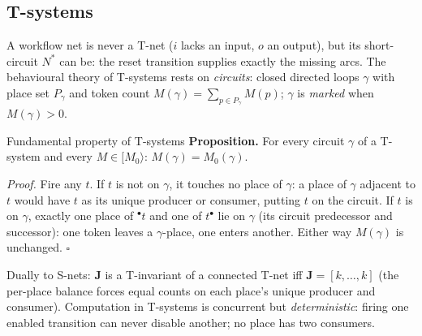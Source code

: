 \subsection{T-systems}

A workflow net is never a T-net ($i$ lacks an input, $o$ an output), but its short-circuit $N^*$ can be: the reset transition supplies exactly the missing arcs. The behavioural theory of T-systems rests on \emph{circuits}: closed directed loops $\gamma$ with place set $P_\gamma$ and token count $M(\gamma) = \sum_{p \in P_\gamma} M(p)$; $\gamma$ is \emph{marked} when $M(\gamma) > 0$.

\begin{notebox}{Fundamental property of T-systems}
\textbf{Proposition.} For every circuit $\gamma$ of a T-system and every $M \in [M_0\rangle$: $M(\gamma) = M_0(\gamma)$.
\par\smallskip
\textit{Proof.} Fire any $t$. If $t$ is not on $\gamma$, it touches no place of $\gamma$: a place of $\gamma$ adjacent to $t$ would have $t$ as its unique producer or consumer, putting $t$ on the circuit. If $t$ is on $\gamma$, exactly one place of ${}^\bullet t$ and one of $t^\bullet$ lie on $\gamma$ (its circuit predecessor and successor): one token leaves a $\gamma$-place, one enters another. Either way $M(\gamma)$ is unchanged. \hfill$\square$
\par\smallskip
Dually to S-nets: $\mathbf{J}$ is a T-invariant of a connected T-net iff $\mathbf{J} = [k, \ldots, k]$ (the per-place balance forces equal counts on each place's unique producer and consumer). Computation in T-systems is concurrent but \emph{deterministic}: firing one enabled transition can never disable another; no place has two consumers.
\end{notebox}

